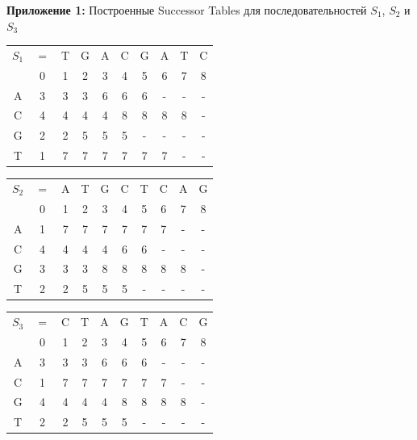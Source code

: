 \documentclass[a4paper,12pt]{extarticle}
\begin{document}
\centerline{\textbf{Приложение 1: }Построенные Successor Tables для последовательностей $S_{1}$, $S_{2}$ и $S_{3}$}
\begin{table}[h!]
  \centering
  \renewcommand{\arraystretch}{1.5}
  \renewcommand{\tabcolsep}{0.25cm}
  \begin{tabular}{ c | c | c | c | c | c | c | c | c | c |}
    $S_{1}$ & $=$ & T & G & A & C & G & A & T & C \\
            & 0 & 1 & 2 & 3 & 4 & 5 & 6 & 7 & 8 \\
    \hline
    A & 3 & 3 & 3 & 6 & 6 & 6 & - & - & - \\
    \hline
    C & 4 & 4 & 4 & 4 & 8 & 8 & 8 & 8 & - \\
    \hline
    G & 2 & 2 & 5 & 5 & 5 & - & - & - & - \\
    \hline
    T & 1 & 7 & 7 & 7 & 7 & 7 & 7 & - & - \\
    \hline
  \end{tabular}
\end{table}
\begin{table}[h!]
  \hspace{-1.5cm}
  \centering
  \renewcommand{\arraystretch}{1.5}
  \renewcommand{\tabcolsep}{0.25cm}
  \begin{tabular}{ c | c | c | c | c | c | c | c | c | c |}
    $S_{2}$ & $=$ & A & T & G & C & T & C & A & G \\
            & 0 & 1 & 2 & 3 & 4 & 5 & 6 & 7 & 8 \\
    \hline
    A & 1 & 7 & 7 & 7 & 7 & 7 & 7 & - & - \\
    \hline
    C & 4 & 4 & 4 & 4 & 6 & 6 & - & - & - \\
    \hline
    G & 3 & 3 & 3 & 8 & 8 & 8 & 8 & 8 & - \\
    \hline
    T & 2 & 2 & 5 & 5 & 5 & - & - & - & - \\
    \hline
  \end{tabular}\hspace{1cm}
  \begin{tabular}{ c | c | c | c | c | c | c | c | c | c |}
    $S_{3}$ & $=$ & C & T & A & G & T & A & C & G \\
            & 0 & 1 & 2 & 3 & 4 & 5 & 6 & 7 & 8 \\
    \hline
    A & 3 & 3 & 3 & 6 & 6 & 6 & - & - & - \\
    \hline
    C & 1 & 7 & 7 & 7 & 7 & 7 & 7 & - & - \\
    \hline
    G & 4 & 4 & 4 & 4 & 8 & 8 & 8 & 8 & - \\
    \hline
    T & 2 & 2 & 5 & 5 & 5 & - & - & - & - \\
    \hline
  \end{tabular}
  \hspace{-1.5cm}
\end{table}
\end{document}
